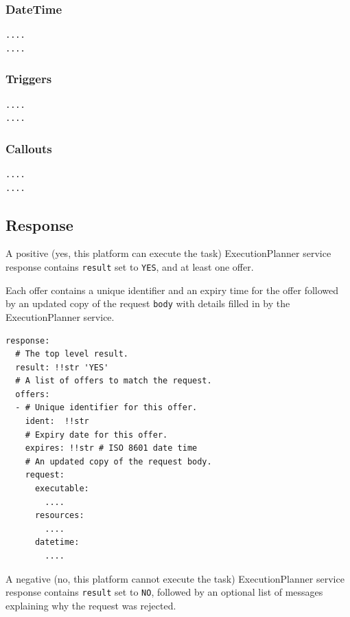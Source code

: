 \documentclass[11pt,a4paper]{ivoa}
\newcommand{\execplanner} {ExecutionPlanner}
\newcommand{\codeword}[1] {\texttt{#1}}
\begin{document}
\subsubsection{DateTime}
\label{datamodel-datetime}

\begin{lstlisting}[]
....
....
\end{lstlisting}

\subsubsection{Triggers}
\label{datamodel-triggers}

\begin{lstlisting}[]
....
....
\end{lstlisting}

\subsubsection{Callouts}
\label{datamodel-callouts}

\begin{lstlisting}[]
....
....
\end{lstlisting}




\subsection{Response}
\label{datamodel-response}

A positive (yes, this platform can execute the task) \execplanner{} service response contains \codeword{result}
set to \codeword{YES}, and at least one offer.

Each offer contains a unique identifier and an expiry time for the offer
followed by an updated copy of the request \codeword{body} with details
filled in by the \execplanner{} service.

\begin{lstlisting}[]
response:
  # The top level result.
  result: !!str 'YES'
  # A list of offers to match the request.
  offers:
  - # Unique identifier for this offer.
    ident:  !!str
    # Expiry date for this offer.
    expires: !!str # ISO 8601 date time
    # An updated copy of the request body.
    request:
      executable:
        ....
      resources:
        ....
      datetime:
        ....
\end{lstlisting}

A negative (no, this platform cannot execute the task) \execplanner{} service response contains \codeword{result}
set to \codeword{NO}, followed by an optional list of messages
explaining why the request was rejected.
\end{document}
